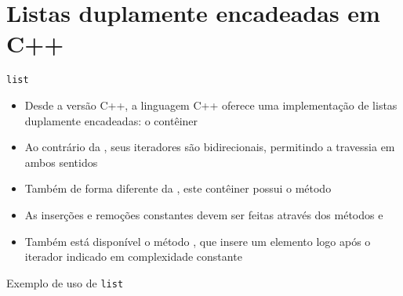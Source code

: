 \section{Listas duplamente encadeadas em C++}

\begin{frame}[fragile]{\texttt{list}}

    \begin{itemize}
        \item Desde a versão C++, a linguagem C++ oferece uma implementação de listas
            duplamente encadeadas: o contêiner 

        \item Ao contrário da , seus iteradores são bidirecionais,
            permitindo a travessia em ambos sentidos

        \item Também de forma diferente da , este contêiner possui o
            método 

        \item As inserções e remoções constantes devem ser feitas através dos métodos
             e 

        \item Também está disponível o método , que insere um elemento
            logo após o iterador indicado em complexidade constante
    \end{itemize}

\end{frame}

\begin{frame}[fragile]{Exemplo de uso de \texttt{list}}
\end{frame}
